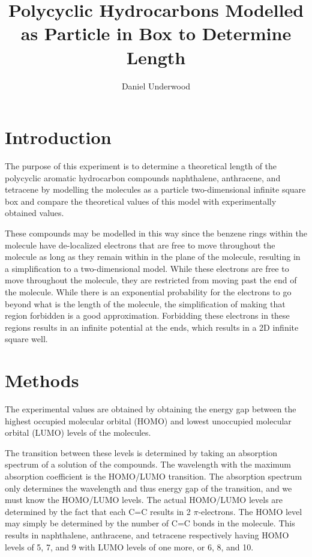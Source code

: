 \documentclass[10pt,a4paper]{article}
\author{Daniel Underwood}
\title{Polycyclic Hydrocarbons Modelled as Particle in Box to Determine Length}
\begin{document}
\maketitle

\section*{Introduction}

The purpose of this experiment is to determine a theoretical length of the polycyclic aromatic hydrocarbon compounds naphthalene, anthracene, and tetracene by modelling the molecules as a particle two-dimensional infinite square box and compare the theoretical values of this model with experimentally obtained values.

These compounds may be modelled in this way since the benzene rings within the molecule have de-localized electrons that are free to move throughout the molecule as long as they remain within in the plane of the molecule, resulting in a simplification to a two-dimensional model. While these electrons are free to move throughout the molecule, they are restricted from moving past the end of the molecule. While there is an exponential probability for the electrons to go beyond what is the length of the molecule, the simplification of making that region forbidden is a good approximation. Forbidding these electrons in these regions results in an infinite potential at the ends, which results in a 2D infinite square well.

\section*{Methods}

The experimental values are obtained by obtaining the energy gap between the highest occupied molecular orbital (HOMO) and lowest unoccupied molecular orbital (LUMO) levels of the molecules.

The transition between these levels is determined by taking an absorption spectrum of a solution of the compounds. The wavelength with the maximum absorption coefficient is the HOMO/LUMO transition. The absorption spectrum only determines the wavelength and thus energy gap of the transition, and we must know the HOMO/LUMO levels. The actual HOMO/LUMO levels are determined by the fact that each C=C results in 2 $\pi$-electrons. The HOMO level may simply be determined by the number of C=C bonds in the molecule. This results in naphthalene, anthracene, and tetracene  respectively having HOMO levels of 5, 7, and 9 with LUMO levels of one more, or 6, 8, and 10.
\end{document}

